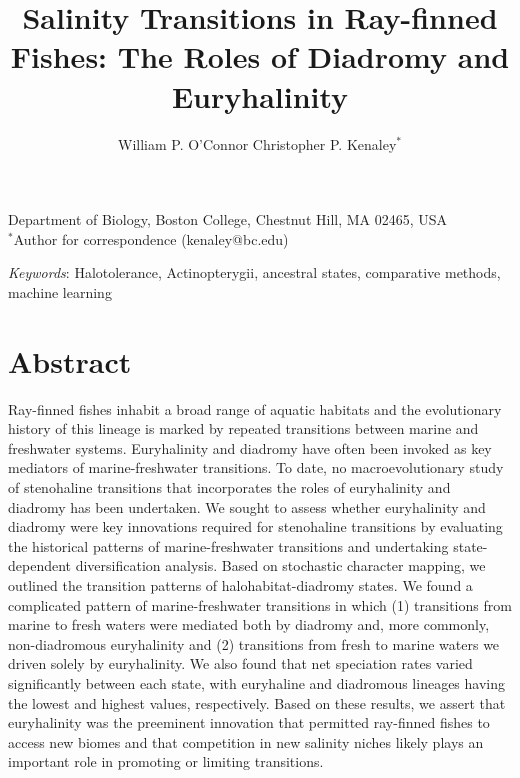 \documentclass[11pt]{article}
\title{Salinity Transitions in Ray-finned Fishes: The Roles of Diadromy and Euryhalinity}
\author{
William P. O'Connor
Christopher P. Kenaley$^*$
}
\date{}
\begin{document}
\maketitle

\noindent Department of Biology, Boston College, Chestnut Hill, MA 02465, USA\\ 
$^{*}$Author for correspondence (kenaley@bc.edu)\\

\bigskip

 
\bigskip

\textit{Keywords}: Halotolerance, Actinopterygii, ancestral states, comparative methods, machine learning

\bigskip


\newpage{}

\section*{Abstract}

Ray-finned fishes inhabit a broad range of aquatic habitats and the evolutionary history of this lineage is marked by repeated transitions between marine and freshwater systems. Euryhalinity and diadromy have often been invoked as key mediators of marine-freshwater transitions. To date, no macroevolutionary study of stenohaline transitions that incorporates the roles of euryhalinity and diadromy has been undertaken. We sought to assess whether euryhalinity and diadromy were key innovations required for stenohaline transitions by evaluating the historical patterns of marine-freshwater transitions and undertaking state-dependent diversification analysis. Based on stochastic character mapping, we outlined the transition patterns of halohabitat-diadromy states. We found a complicated pattern of marine-freshwater transitions in which (1) transitions from marine to fresh waters were mediated both by diadromy and, more commonly, non-diadromous euryhalinity and (2) transitions from fresh to marine waters we driven solely by euryhalinity. We also found that net speciation rates varied significantly between each state, with euryhaline and diadromous lineages having the lowest and highest values, respectively. Based on these results, we assert that euryhalinity was the preeminent innovation that permitted ray-finned fishes to access new biomes and that competition in new salinity niches likely plays an important role in promoting or limiting transitions.
\end{document}
